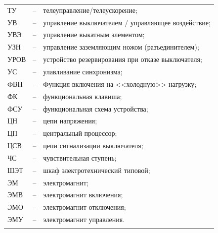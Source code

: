 \begin{longtable}{>{\raggedright\arraybackslash}m{2cm}>{\raggedright\arraybackslash}m{0.5cm}>{\raggedright\arraybackslash}m{20cm}}
ТУ & -- & телеуправление/телеускорение; \\
УВ & -- & управление выключателем / управляющее воздействие; \\
УВЭ & -- & управление выкатным элементом; \\
УЗН & -- & управление заземляющим ножом (разъединителем); \\
УРОВ & -- & устройство резервирования при отказе выключателя; \\
УС & -- & улавливание синхронизма; \\
ФВН & -- & Функция включения на <<холодную>> нагрузку; \\
ФК & -- & функциональная клавиша; \\
ФСУ & -- & функциональная схема устройства; \\
ЦН & -- & цепи напряжения; \\
ЦП & -- & центральный процессор; \\
ЦСВ & -- & цепи сигнализации выключателя; \\
ЧС & -- & чувствительная ступень; \\
ШЭТ & -- & шкаф электротехнический типовой; \\
ЭМ & -- & электромагнит; \\
ЭМВ & -- & электромагнит включения; \\
ЭМО & -- & электромагнит отключения; \\
ЭМУ & -- & электромагнит управления. \\
{\color{white}\fontsize{0.1pt}{0.1pt}\selectfont<endABBRS>}
\end{longtable}
